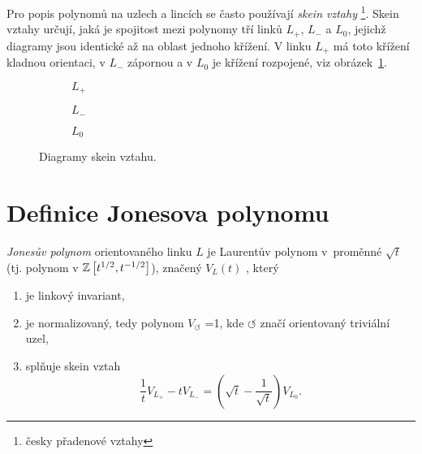 Pro popis polynomů na uzlech a lincích se často používají \emph{skein vztahy} \footnote{česky přadenové vztahy}.
Skein vztahy určují, jaká je spojitost mezi polynomy tří linků $L_+$, $ L_-$ a $L_0$, jejichž diagramy jsou identické až na oblast jednoho křížení. V linku $L_+$ má toto křížení kladnou orientaci, v $L_-$ zápornou a v $L_0$ je křížení rozpojené, viz obrázek~\ref{skeinobr}.

\begin{figure}[h]    
\centering 
\begin{subfigure}[t]{0.4\linewidth}\centering
{} 
\caption{$L_+$} 
\end{subfigure}
\begin{subfigure}[t]{0.4\linewidth}\centering
{}  
\caption{$L_-$}
\end{subfigure}
\begin{subfigure}[t]{0.4\linewidth}\centering
{}
\caption{$L_0$}
\end{subfigure}
\caption{Diagramy skein vztahu.}
\label{skeinobr}
\end{figure}

\section{Definice Jonesova polynomu}

\begin{definice}\label{def01:1}
\emph{Jonesův polynom} orientovaného linku $L$ je Laurentův polynom v~proměnné $\sqrt{t}$ (tj. polynom v $\mathbb{Z}\left[t^{1/2}, t^{-1/2}\right]$), značený $V_L(t)$ , který
\begin{enumerate}
\item
je linkový invariant,
\item 
  je normalizovaný, tedy polynom  $V_{\pmb{\circlearrowleft}}$ =1, kde ${\pmb{\circlearrowleft}}$ značí orientovaný triviální uzel,
\item  
splňuje skein vztah 
\begin{equation} \label{skein}
\frac{1}{t} V_{L_+} - t V_{L_-} = \left( \sqrt{t}  - \frac{1}{\sqrt{t}}\right) V_{L_0}.
\end{equation}
\end{enumerate}
\end{definice}

